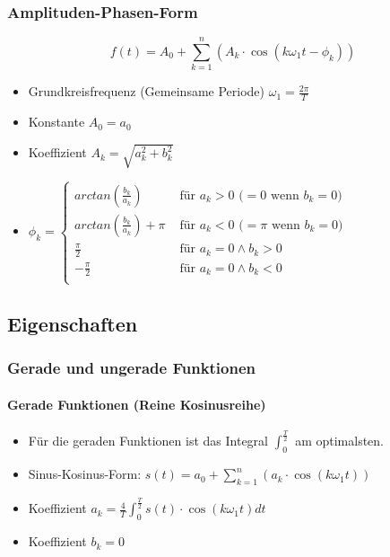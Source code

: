 \subsubsection{Amplituden-Phasen-Form}
\[
  f(t) = A_0 + \sum_{k=1}^{n}
  (A_k \cdot \cos(k \omega_1 t  - \phi_k))
\]
\begin{itemize}
  \item Grundkreisfrequenz (Gemeinsame Periode) $\omega_1 = \frac{2\pi}{T}$
  \item Konstante $A_0 = a_0$
  \item Koeffizient $A_k = \sqrt{a_k^2 + b_k^2}$
  \item $\phi_k =  \begin{cases}
      arctan\left(\frac{b_k}{a_k}\right) & \text{ für } a_k > 0 
        \text{ (}= 0 \text{ wenn } b_k = 0 \text{)}\\
      arctan\left(\frac{b_k}{a_k}\right) + \pi & \text{ für } a_k < 0
        \text{ (}= \pi \text{ wenn } b_k = 0 \text{)}\\
      \frac{\pi}{2} & \text{ für } a_k = 0 \wedge b_k > 0\\
      -\frac{\pi}{2} & \text{ für } a_k = 0 \wedge b_k < 0\\
    \end{cases}$
\end{itemize}

\subsection{Eigenschaften}
\subsubsection{Gerade und ungerade Funktionen}
\paragraph{Gerade Funktionen (Reine Kosinusreihe)}
\begin{itemize}
  \item Für die geraden Funktionen ist das Integral
    $\int_0^{\frac{T}{2}}$ am optimalsten.
  \item Sinus-Kosinus-Form: $s(t) = a_0 + \sum_{k=1}^{n}
    (a_k \cdot \cos(k \omega_1 t))$
  \item Koeffizient $a_k = \frac{4}{T} \int_0^{\frac{T}{2}} s(t) \cdot \cos(k \omega_1 t) dt$
  \item Koeffizient $b_k = 0$
\end{itemize}
